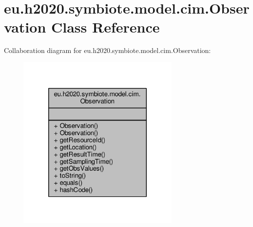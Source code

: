 \hypertarget{classeu_1_1h2020_1_1symbiote_1_1model_1_1cim_1_1Observation}{}\section{eu.\+h2020.\+symbiote.\+model.\+cim.\+Observation Class Reference}
\label{classeu_1_1h2020_1_1symbiote_1_1model_1_1cim_1_1Observation}


Collaboration diagram for eu.\+h2020.\+symbiote.\+model.\+cim.\+Observation\+:\nopagebreak
\begin{figure}[H]
\begin{center}
\leavevmode
\includegraphics[width=228pt]{classeu_1_1h2020_1_1symbiote_1_1model_1_1cim_1_1Observation__coll__graph}
\end{center}
\end{figure}
